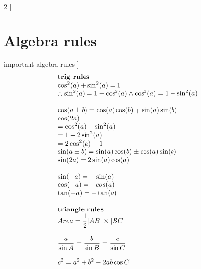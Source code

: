 \documentclass{article}
\begin{document}
\setlength{\columnsep}{2cm}
\begin{multicols}{2}
    [
    \section{Algebra rules}
    important algebra rules 
    ]
    \[
    \begin{array}{>{\displaystyle}l}
        \textbf{trig\ rules}\\
        \cos^{2}( a) +\sin^{2}( a) =1\\
        \therefore \sin^{2}( a) =1-\cos^{2}( a) \land \cos^{2}( a) =1-\sin^{2}( a)\\
        \\
        \cos( a\pm b) =\cos( a)\cos( b) \mp \sin( a)\sin( b)\\
        \cos( 2a)\\
        =\cos^{2}( a) -\sin^{2}( a)\\
        =1-2\sin^{2}( a)\\
        =2\cos^{2}( a) -1
        \\
        \sin( a\pm b) =\sin( a)\cos( b) \pm \cos( a)\sin( b)\\
        \sin( 2a) =2\sin( a)\cos( a)\\
        \\
        \sin( -a) =-\sin( a)\\
        \cos( -a) =+cos( a)\\
        \tan( -a) =-\tan( a)\\
        \\
        \textbf{triangle\ rules}\\
        Area=\frac{1}{2} |AB|\times |BC|\\
        \\
        \frac{a}{\sin A} =\frac{b}{\sin B} =\frac{c}{\sin C}\\
        \\
        c^{2} =a^{2} +b^{2} -2ab\cos C
        \\
        

\end{array}\]
\end{multicols}
\end{document}
